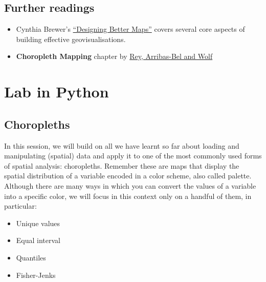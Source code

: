 \documentclass[
  letterpaper,
  DIV=11,
  numbers=noendperiod]{scrreprt}
\begin{document}
\section*{Further readings}\label{further-readings-1}


\begin{itemize}
\item
  Cynthia Brewer's
  \href{https://www.esri.com/en-us/esri-press/browse/designing-better-maps-a-guide-for-gis-users}{``Designing
  Better Maps''} covers several core aspects of building effective
  geovisualisations.
\item
  \textbf{Choropleth Mapping} chapter by
  \href{https://geographicdata.science/book/notebooks/05_choropleth.html}{Rey,
  Arribas-Bel and Wolf}
\end{itemize}

\chapter*{Lab in Python}\label{sec-vector-data-Python}


\section*{Choropleths}\label{choropleths-1}


In this session, we will build on all we have learnt so far about
loading and manipulating (spatial) data and apply it to one of the most
commonly used forms of spatial analysis: choropleths. Remember these are
maps that display the spatial distribution of a variable encoded in a
color scheme, also called palette. Although there are many ways in which
you can convert the values of a variable into a specific color, we will
focus in this context only on a handful of them, in particular:

\begin{itemize}
\item
  Unique values
\item
  Equal interval
\item
  Quantiles
\item
  Fisher-Jenks
\end{itemize}
\end{document}
